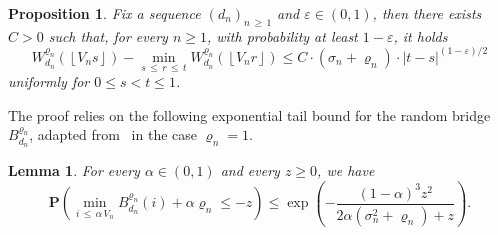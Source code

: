 \documentclass[10pt]{amsart}
\newtheorem{lemm}[theo]{Lemma}\newtheorem{prop}[theo]{Proposition}\newtheorem{coro}[theo]{Corollary}\newtheorem{conj}[theo]{Conjecture}
\theoremstyle{definition}\newtheorem{defi}[theo]{Definition}\newtheorem{rema}[theo]{Remark}\newtheorem{exam}[theo]{Example}\newtheorem{exem}[theo]{Example}\newtheorem{nota}[theo]{Notation}
\newcommand{\ensembles}[1]{\mathbf{#1}}
\renewcommand{\P}{\ensembles{P}}
\renewcommand{\Pr}[1]{\P\left(#1\right)}
\newcommand{\1}{\ensembles{1}}
\renewcommand{\le}{\leqslant}
\renewcommand{\ge}{\geqslant}
\newcommand{\Wfn}{W_{d_n}^{\varrho_n}}
\newcommand{\Bfn}{B_{d_n}^{\varrho_n}}
\newcommand{\vertices}{V}
\providecommand{\?}{}
\begin{document}
\begin{prop}\label{prop:Holder_marche_Luka}
Fix a sequence $(d_n)_{n\,\ge\,1}$ and $\varepsilon \in (0,1)$, then there exists $C > 0$ such that, for every $n \ge 1$, with probability at least $1-\varepsilon$, it holds
\[
\Wfn\left(\left\lfloor\vertices_ns\right\rfloor\right) - \min_{s\,\le\,r\,\le\,t} \Wfn\left(\left\lfloor\vertices_nr\right\rfloor\right)
\le C \cdot \left(\sigma_n + \varrho_n\right) \cdot |t-s|^{(1-\varepsilon)/2}
\]
uniformly for $0 \le s < t \le 1$.
\end{prop}


The proof relies on the following exponential tail bound for the random bridge $\Bfn$, adapted from~\cite[Section~3]{AB12} in the case $\varrho_n=1$.

\begin{lemm}\label{lem:queue_exp_min_pont}
For every $\alpha \in (0,1)$ and every $z \ge 0$, we have
\[
\Pr{\min_{i\,\le\,\alpha\,\vertices_n} \Bfn(i) + \alpha \varrho_n \le - z}
\le \exp\left(- \frac{(1 - \alpha)^3 z^2}{2 \alpha \left(\sigma_n^2+\varrho_n\right) + z}\right).
\]
\end{lemm}
\end{document}

